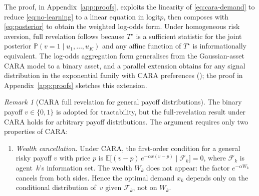 \documentclass[12pt,letterpaper]{article}
\theoremstyle{definition}
\theoremstyle{remark}
\newtheorem{remark}{Remark}
\newcommand{\E}{\mathbb{E}}
\newcommand{\PP}{\mathbb{P}}
\newcommand{\logit}{\mathrm{logit}}
\newcommand{\Tstar}{T^{\!\star}}
\newcommand{\1}{\mathbf{1}}
\begin{document}
The proof, in Appendix~\ref{app:proofs}, exploits the linearity of
\eqref{eq:cara-demand} to reduce \eqref{eq:no-learning} to a linear equation
in $\logit p$, then composes with \eqref{eq:posterior} to obtain the
weighted log-odds form. Under homogeneous risk aversion, full revelation
follows because $\Tstar$ is a sufficient statistic for the joint posterior
$\PP(v=1\mid u_{1},\ldots,u_{K})$ and any affine function of $\Tstar$ is
informationally equivalent. The log-odds aggregation form generalises
\citet{DeMarzoSkiadas1998} from the Gaussian-asset CARA model to a binary
asset, and a parallel extension obtains for any signal distribution in the
exponential family with CARA preferences (\citealp{BreonDrish2015}); the
proof in Appendix~\ref{app:proofs} sketches this extension.

\begin{remark}[CARA full revelation for general payoff distributions]%
\label{rem:general-payoff}
The binary payoff $v\in\{0,1\}$ is adopted for tractability, but the
full-revelation result under CARA holds for arbitrary payoff
distributions. The argument requires only two properties of CARA:
\begin{enumerate}[label=(\roman*),topsep=2pt,itemsep=2pt]
\item \emph{Wealth cancellation.} Under CARA, the first-order condition
for a general risky payoff $v$ with price $p$ is
$\E\bigl[(v-p)\,e^{-\alpha x(v-p)} \mid \mathcal{F}_{k}\bigr]=0$,
where $\mathcal{F}_{k}$ is agent~$k$'s information set.  The wealth
$W_{k}$ does not appear: the factor $e^{-\alpha W_{k}}$ cancels from
both sides.  Hence the optimal demand $x_{k}$ depends only on the
conditional distribution of~$v$ given $\mathcal{F}_{k}$, not on
$W_{k}$.


\end{enumerate}
\end{remark}
\end{document}
